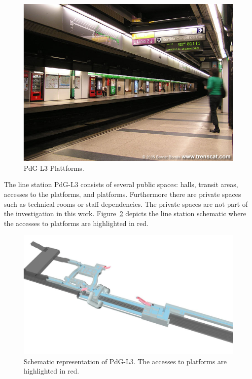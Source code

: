 \begin{figure}[htb]
  \centering
  \includegraphics[width=\linewidth]{Figures/PdG-L3_platforms.jpg} 
  \caption{PdG-L3 Plattforms. \cite{TMB}}
  \label{fig:PdG-L3_platforms}
\end{figure}

The line station PdG-L3 consists of several public spaces: halls, transit areas, accesses to the platforms, and platforms. Furthermore there are private spaces such as technical rooms or staff dependencies. The private spaces are not part of the investigation in this work. Figure~\ref{fig:PdG-L3_schematic} depicts the line station schematic where the accesses to platforms are highlighted in red.

\begin{figure}[htb]
  \centering
  \includegraphics[width=\linewidth]{Figures/PdG-L3_schematic.jpg} 
  \caption{Schematic representation of PdG-L3. The accesses to platforms are highlighted in red. \cite{TMB}}
  \label{fig:PdG-L3_schematic}
\end{figure}

